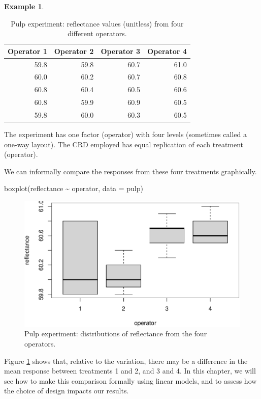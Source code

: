 \documentclass[
]{book}
\newenvironment{Shaded}{\begin{snugshade}}{\end{snugshade}}
\newcommand{\AttributeTok}[1]{\textcolor[rgb]{0.77,0.63,0.00}{#1}}
\newcommand{\FunctionTok}[1]{\textcolor[rgb]{0.00,0.00,0.00}{#1}}
\newcommand{\NormalTok}[1]{#1}
\newcommand{\SpecialCharTok}[1]{\textcolor[rgb]{0.00,0.00,0.00}{#1}}
\theoremstyle{definition}
\theoremstyle{definition}
\newtheorem{example}{Example}[chapter]
\theoremstyle{definition}
\theoremstyle{definition}
\theoremstyle{remark}
\begin{document}
\begin{example}
\begin{table}

\caption{\label{tab:pulp-expt-data}Pulp experiment: reflectance values (unitless) from four different operators.}
\centering
\begin{tabular}[t]{r|r|r|r}
\hline
Operator 1 & Operator 2 & Operator 3 & Operator 4\\
\hline
59.8 & 59.8 & 60.7 & 61.0\\
\hline
60.0 & 60.2 & 60.7 & 60.8\\
\hline
60.8 & 60.4 & 60.5 & 60.6\\
\hline
60.8 & 59.9 & 60.9 & 60.5\\
\hline
59.8 & 60.0 & 60.3 & 60.5\\
\hline
\end{tabular}
\end{table}

The experiment has one factor (operator) with four levels (sometimes called a one-way layout). The CRD employed has equal replication of each treatment (operator).

We can informally compare the responses from these four treatments graphically.

\begin{Shaded}
\begin{Highlighting}[]
\FunctionTok{boxplot}\NormalTok{(reflectance }\SpecialCharTok{\textasciitilde{}}\NormalTok{ operator, }\AttributeTok{data =}\NormalTok{ pulp)}
\end{Highlighting}
\end{Shaded}

\begin{figure}

{\centering \includegraphics{bookdown_math3014-6027_files/figure-latex/pulp-boxplot-1} 

}

\caption{Pulp experiment: distributions of reflectance from the four operators.}\label{fig:pulp-boxplot}
\end{figure}

Figure \ref{fig:pulp-boxplot} shows that, relative to the variation, there may be a difference in the mean response between treatments 1 and 2, and 3 and 4. In this chapter, we will see how to make this comparison formally using linear models, and to assess how the choice of design impacts our results.

\end{example}
\end{document}
